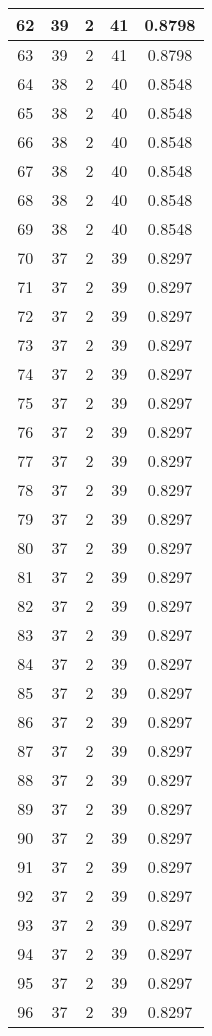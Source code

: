 \documentclass[letterpaper, 12pt]{article}
\begin{document}
\begin{longtable}{|c|c|c|c|c|}
\hline
62 & 39 & 2 & 41 & 0.8798 \\
\hline
63 & 39 & 2 & 41 & 0.8798 \\
\hline
64 & 38 & 2 & 40 & 0.8548 \\
\hline
65 & 38 & 2 & 40 & 0.8548 \\
\hline
66 & 38 & 2 & 40 & 0.8548 \\
\hline
67 & 38 & 2 & 40 & 0.8548 \\
\hline
68 & 38 & 2 & 40 & 0.8548 \\
\hline
69 & 38 & 2 & 40 & 0.8548 \\
\hline
70 & 37 & 2 & 39 & 0.8297 \\
\hline
71 & 37 & 2 & 39 & 0.8297 \\
\hline
72 & 37 & 2 & 39 & 0.8297 \\
\hline
73 & 37 & 2 & 39 & 0.8297 \\
\hline
74 & 37 & 2 & 39 & 0.8297 \\
\hline
75 & 37 & 2 & 39 & 0.8297 \\
\hline
76 & 37 & 2 & 39 & 0.8297 \\
\hline
77 & 37 & 2 & 39 & 0.8297 \\
\hline
78 & 37 & 2 & 39 & 0.8297 \\
\hline
79 & 37 & 2 & 39 & 0.8297 \\
\hline
80 & 37 & 2 & 39 & 0.8297 \\
\hline
81 & 37 & 2 & 39 & 0.8297 \\
\hline
82 & 37 & 2 & 39 & 0.8297 \\
\hline
83 & 37 & 2 & 39 & 0.8297 \\
\hline
84 & 37 & 2 & 39 & 0.8297 \\
\hline
85 & 37 & 2 & 39 & 0.8297 \\
\hline
86 & 37 & 2 & 39 & 0.8297 \\
\hline
87 & 37 & 2 & 39 & 0.8297 \\
\hline
88 & 37 & 2 & 39 & 0.8297 \\
\hline
89 & 37 & 2 & 39 & 0.8297 \\
\hline
90 & 37 & 2 & 39 & 0.8297 \\
\hline
91 & 37 & 2 & 39 & 0.8297 \\
\hline
92 & 37 & 2 & 39 & 0.8297 \\
\hline
93 & 37 & 2 & 39 & 0.8297 \\
\hline
94 & 37 & 2 & 39 & 0.8297 \\
\hline
95 & 37 & 2 & 39 & 0.8297 \\
\hline
96 & 37 & 2 & 39 & 0.8297 \\

\end{longtable}
\end{document}
